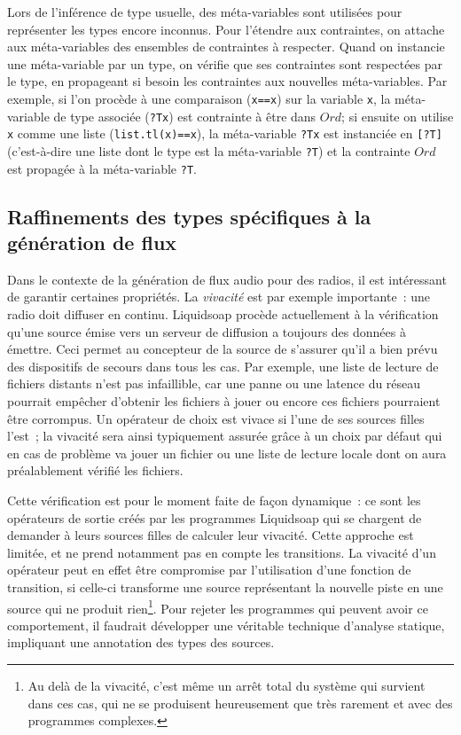 \documentclass[twoside]{article}
\newcommand{\liquidsoap}{Liquidsoap}
\theoremstyle{plain}
\theoremstyle{definition}
\theoremstyle{remark}
\begin{document}
Lors de l'inférence de type usuelle, des méta-variables sont utilisées pour 
représenter les types encore inconnus. Pour l'étendre aux contraintes,
on attache aux méta-variables des ensembles de contraintes à respecter.
Quand on instancie une méta-variable par un type, on 
vérifie que ses contraintes sont respectées par le type, en 
propageant si besoin les contraintes aux nouvelles méta-variables.
Par exemple, si l'on procède à une comparaison (\verb.x==x.) sur la
variable \verb.x., la méta-variable de type associée (\verb.?Tx.) est
contrainte à être dans $Ord$; si ensuite on utilise \verb.x. comme une liste
(\verb:list.tl(x)==x:), la méta-variable \verb.?Tx. est instanciée en
\verb.[?T]. (c'est-à-dire une liste dont le type est la méta-variable \verb.?T.)
et la contrainte $Ord$ est propagée à la méta-variable \verb.?T..

\subsection{Raffinements des types spécifiques à la génération de flux}
\label{sec:raffinements}

Dans le contexte de la génération de flux audio pour des radios, il est
intéressant de garantir certaines propriétés. La \emph{vivacité} est par exemple
importante~: une radio doit diffuser en continu. \liquidsoap{} procède
actuellement à la vérification qu'une source émise vers un serveur de diffusion
a toujours des données à émettre. Ceci permet au concepteur de la source de
s'assurer qu'il a bien prévu des dispositifs de secours dans tous les cas. Par
exemple, une liste de lecture de fichiers distants n'est pas infaillible, car
une panne ou une latence du réseau pourrait empêcher d'obtenir les fichiers à
jouer ou encore ces fichiers pourraient être corrompus. Un opérateur de choix est
vivace si l'une de ses sources filles l'est~; la vivacité sera ainsi typiquement
assurée grâce à un choix par défaut qui en cas de problème va jouer un fichier
ou une liste de lecture locale dont on aura préalablement vérifié les fichiers.

Cette vérification est pour le moment faite de façon dynamique~: ce sont les
opérateurs de sortie créés par les programmes \liquidsoap{} qui se chargent de
demander à leurs sources filles de calculer leur vivacité. Cette approche est 
limitée, et ne prend notamment pas en compte les transitions.
La vivacité d'un opérateur peut en effet être compromise par l'utilisation 
d'une fonction de transition, si celle-ci transforme une source représentant la 
nouvelle piste en une source qui ne produit rien\footnote{Au delà de la vivacité,
c'est même un arrêt total du système qui survient dans 
ces cas, qui ne se produisent heureusement que très rarement
et avec des programmes complexes.}.
Pour rejeter les programmes qui peuvent avoir ce comportement,
il faudrait développer une véritable 
technique d'analyse statique, impliquant une annotation des types des sources.
\end{document}
